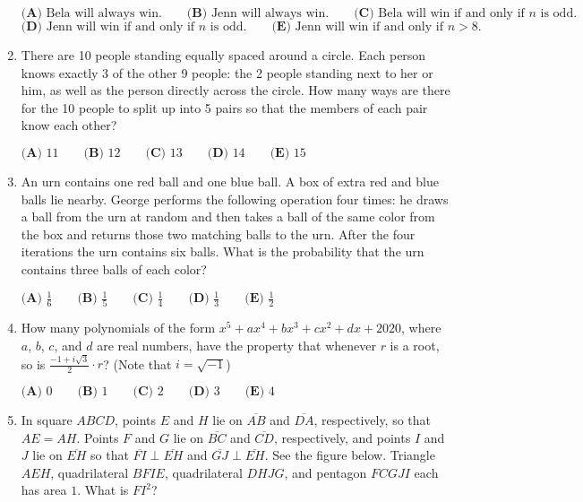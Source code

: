 \documentclass{article}
\begin{document}
\begin{enumerate}[label=\arabic*., itemsep=0.5em]
\(\textbf{(A)} \text{ Bela will always win.} \qquad \textbf{(B)} \text{ Jenn will always win.} \qquad \textbf{(C)} \text{ Bela will win if and only if }n \text{ is odd.}\)
\(\textbf{(D)} \text{ Jenn will win if and only if }n \text{ is odd.} \qquad \textbf{(E)} \text { Jenn will win if and only if } n>8.\)\par \vspace{0.5em}\item There are 10 people standing equally spaced around a circle. Each person knows exactly 3 of the other 9 people: the 2 people standing next to her or him, as well as the person directly across the circle. How many ways are there for the 10 people to split up into 5 pairs so that the members of each pair know each other?

\(\textbf{(A) } 11 \qquad \textbf{(B) } 12 \qquad \textbf{(C) } 13 \qquad \textbf{(D) } 14 \qquad \textbf{(E) } 15\)\par \vspace{0.5em}\item An urn contains one red ball and one blue ball. A box of extra red and blue balls lie nearby. George performs the following operation four times: he draws a ball from the urn at random and then takes a ball of the same color from the box and returns those two matching balls to the urn. After the four iterations the urn contains six balls. What is the probability that the urn contains three balls of each color?

\(\textbf{(A) } \frac16 \qquad \textbf{(B) }\frac15 \qquad \textbf{(C) } \frac14 \qquad \textbf{(D) } \frac13 \qquad \textbf{(E) } \frac12\)\par \vspace{0.5em}\item How many polynomials of the form \(x^5 + ax^4 + bx^3 + cx^2 + dx + 2020\), where \(a\), \(b\), \(c\), and \(d\) are real numbers, have the property that whenever \(r\) is a root, so is \(\frac{-1+i\sqrt{3}}{2} \cdot r\)? (Note that \(i=\sqrt{-1}\))

\(\textbf{(A) } 0 \qquad \textbf{(B) }1 \qquad \textbf{(C) } 2 \qquad \textbf{(D) } 3 \qquad \textbf{(E) } 4\)\par \vspace{0.5em}\item In square \(ABCD\), points \(E\) and \(H\) lie on \(\overline{AB}\) and \(\overline{DA}\), respectively, so that \(AE=AH.\) Points \(F\) and \(G\) lie on \(\overline{BC}\) and \(\overline{CD}\), respectively, and points \(I\) and \(J\) lie on \(\overline{EH}\) so that \(\overline{FI} \perp \overline{EH}\) and \(\overline{GJ} \perp \overline{EH}\). See the figure below. Triangle \(AEH\), quadrilateral \(BFIE\), quadrilateral \(DHJG\), and pentagon \(FCGJI\) each has area \(1.\) What is \(FI^2\)?


\end{enumerate}
\end{document}
